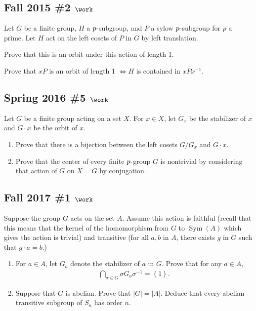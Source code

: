 \hypertarget{fall-2015-2-work}{%
\subsection{\texorpdfstring{Fall 2015 \#2
\(\work\)}{Fall 2015 \#2 \textbackslash work}}\label{fall-2015-2-work}}

Let \(G\) be a finite group, \(H\) a \(p{\hbox{-}}\)subgroup, and \(P\)
a sylow \(p{\hbox{-}}\)subgroup for \(p\) a prime. Let \(H\) act on the
left cosets of \(P\) in \(G\) by left translation.

Prove that this is an orbit under this action of length 1.

Prove that \(xP\) is an orbit of length 1 \(\iff H\) is contained in
\(xPx^{-1}\).

\hypertarget{spring-2016-5-work}{%
\subsection{\texorpdfstring{Spring 2016 \#5
\(\work\)}{Spring 2016 \#5 \textbackslash work}}\label{spring-2016-5-work}}

Let \(G\) be a finite group acting on a set \(X\). For \(x\in X\), let
\(G_x\) be the stabilizer of \(x\) and \(G\cdot x\) be the orbit of
\(x\).

\begin{enumerate}
\def\labelenumi{\alph{enumi}.}
\item
  Prove that there is a bijection between the left cosets \(G/G_x\) and
  \(G\cdot x\).
\item
  Prove that the center of every finite \(p{\hbox{-}}\)group \(G\) is
  nontrivial by considering that action of \(G\) on \(X=G\) by
  conjugation.
\end{enumerate}

\hypertarget{fall-2017-1-work}{%
\subsection{\texorpdfstring{Fall 2017 \#1
\(\work\)}{Fall 2017 \#1 \textbackslash work}}\label{fall-2017-1-work}}

Suppose the group \(G\) acts on the set \(A\). Assume this action is
faithful (recall that this means that the kernel of the homomorphism
from \(G\) to \(\operatorname{Sym}(A)\) which gives the action is
trivial) and transitive (for all \(a, b\) in \(A\), there exists \(g\)
in \(G\) such that \(g \cdot a = b\).)

\begin{enumerate}
\def\labelenumi{\alph{enumi}.}
\item
  For \(a \in A\), let \(G_a\) denote the stabilizer of \(a\) in \(G\).
  Prove that for any \(a \in A\),
  \begin{align*}
  \bigcap_{\sigma\in G} \sigma G_a \sigma^{-1}= \left\{{1}\right\}
  .\end{align*}
\item
  Suppose that \(G\) is abelian. Prove that \(|G| = |A|\). Deduce that
  every abelian transitive subgroup of \(S_n\) has order \(n\).
\end{enumerate}

